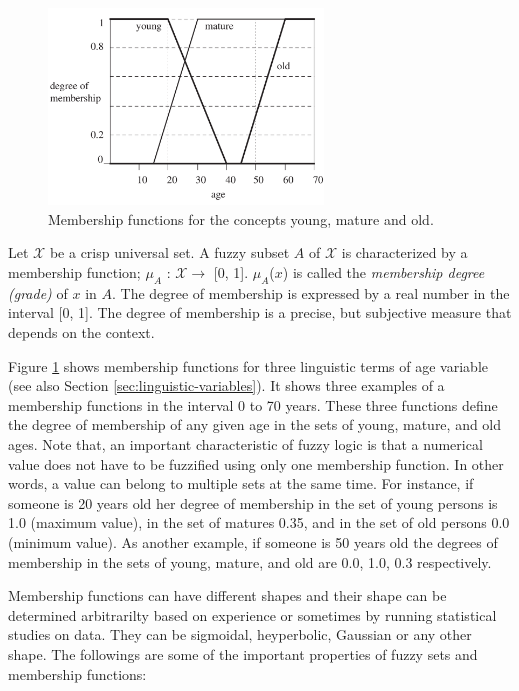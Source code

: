 \documentclass[11pt]{article}
\begin{document}
\begin{figure}[tbh]
  \center
  \includegraphics[width=0.65\textwidth]{figure/membership-function.png}
  \caption{Membership functions for the concepts young, mature and old.}
  \label{fig:membership-function}
\end{figure}

Let $\mathcal{X}$ be a crisp universal set. A fuzzy subset $\textit{A}$ of
$\mathcal{X}$ is characterized by a membership function; $\mu_A$ : $\mathcal{X}
\rightarrow$ [0, 1]. $\mu_A$($\textit{x}$) is called the \textit{membership
degree (grade)} of $\textit{x}$ in $\textit{A}$. The degree of membership is
expressed by a real number in the interval [0, 1]. The degree of membership is a
precise, but subjective measure that depends on the context.

Figure \ref{fig:membership-function} shows membership functions for three
linguistic terms of age variable (see also Section
\ref{sec:linguistic-variables}). It shows three examples of a membership
functions in the interval 0 to 70 years. These three functions define the degree
of membership of any given age in the sets of young, mature, and old ages. Note
that, an important characteristic of fuzzy logic is that a numerical value does
not have to be fuzzified using only one membership function. In other words, a
value can belong to multiple sets at the same time. For instance, if someone is
20 years old her degree of membership in the set of young persons is 1.0
(maximum value), in the set of matures 0.35, and in the set of old persons 0.0
(minimum value). As another example, if someone is 50 years old the degrees of
membership in the sets of young, mature, and old are 0.0, 1.0, 0.3 respectively.

Membership functions can have different shapes and their shape can be determined
arbitrarilty based on experience or sometimes by running statistical studies on
data. They can be sigmoidal, heyperbolic, Gaussian or any other shape. The
followings are some of the important properties of fuzzy sets and membership
functions:\\
\end{document}

